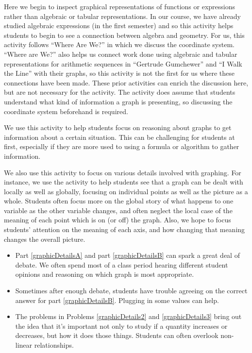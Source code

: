 \documentclass[nooutcomes]{ximera}
\begin{document}
\begin{instructorNotes}
Here we begin to inspect graphical representations of functions or expressions rather than algebraic or tabular representations.  In our course, we have already studied algebraic expressions (in the first semester) and so this activity helps students to begin to see a connection between algebra and geometry.  For us, this activity follows ``Where Are We?'' in which we discuss the coordinate system.  ``Where are We?'' also helps us connect work done using algebraic and tabular representations for arithmetic sequences in ``Gertrude Gumchewer'' and ``I Walk the Line'' with their graphs, so this activity is not the first for us where these connections have been made.  These prior activities can enrich the discussion here, but are not necessary for the activity.  The activity does assume that students understand what kind of information a graph is presenting, so discussing the coordinate system beforehand is required.

We use this activity to help students focus on reasoning about graphs to get information about a certain situation.  This can be challenging for students at first, especially if they are more used to using a formula or algorithm to gather information.

We also use this activity to focus on various details involved with graphing.  For instance, we use the activity to help students see that a graph can be dealt with locally as well as globally, focusing on individual points as well as the picture as a whole.  Students often focus more on the global story of what happens to one variable as the other variable changes, and often neglect the local case of the meaning of each point which is on (or off) the graph.  Also, we hope to focus students' attention on the meaning of each axis, and how changing that meaning changes the overall picture.



\begin{itemize}
    \item Part \ref{graphicDetailsA} and part \ref{graphicDetailsB} can spark a great deal of debate.  We often spend most of a class period hearing different student opinions and reasoning on which graph is most appropriate.
    \item Sometimes after enough debate, students have trouble agreeing on the correct answer for part \ref{graphicDetailsB}.  Plugging in some values can help.
    \item The problems in Problems \ref{graphicDetails2} and \ref{graphicDetails3} bring out the idea that it's important not only to study if a quantity increases or decreases, but how it does those things.  Students can often overlook non-linear relationships.
\end{itemize}




\end{instructorNotes}
\end{document}
